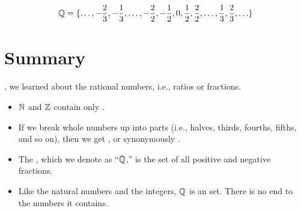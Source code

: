 \documentclass[../../../main.tex]{subfiles}
\begin{document}
\begin{align*}
  \Rationals/ = \{ \ldots, -\frac{2}{3}, -\frac{1}{3}, \ldots, -\frac{2}{2}, -\frac{1}{2}, 0, \frac{1}{2}, \frac{2}{2}, \ldots, \frac{1}{3}, \frac{2}{3}, \ldots \}
\end{align*}


\section{Summary}

, we learned about the rational numbers, i.e., ratios or fractions. 

\begin{itemize}

  \item $\Nats/$ and $\Ints/$ contain only .
  
  \item If we break whole numbers up into parts (i.e., halves, thirds, fourths, fifths, and so on), then we get , or synonymously .
  
  \item The , which we denote as ``$\Rationals/$,'' is the set of all positive and negative fractions. 
  
  \item Like the natural numbers and the integers, $\Rationals/$ is an  set. There is no end to the numbers it contains.

\end{itemize}
\end{document}
